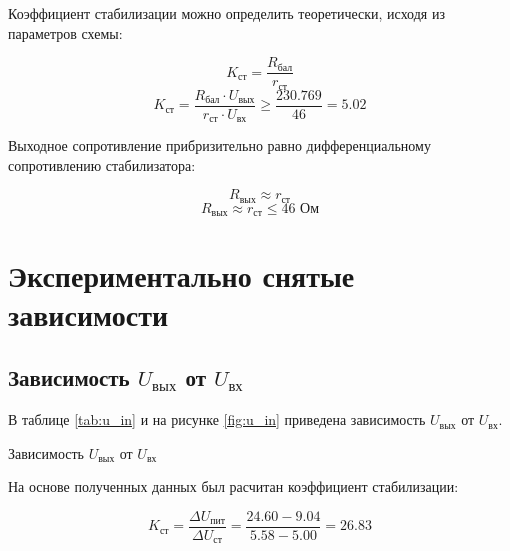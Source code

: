 Коэффициент стабилизации можно определить теоретически, исходя из параметров схемы:

\begin{equation}\label{eq:k_st}
K_\text{ст} = \frac{R_\text{бал}}{r_\text{ст}}
\end{equation}
\[
K_\text{ст} = \frac{R_\text{бал} \cdot U_\text{вых}}{r_\text{ст} \cdot U_\text{вх}} \geq \frac{230.769}{46} = 5.02
\]

\vspace{0.5cm}

Выходное сопротивление прибризительно равно дифференциальному сопротивлению стабилизатора:

\begin{equation}\label{eq:r_out}
R_\text{вых} \approx r_{\text{ст}}
\end{equation}
\[
R_\text{вых} \approx r_{\text{ст}} \leq 46 \text{ Ом}
\]

\section{Экспериментально снятые зависимости}

\subsection{Зависимость $U_\text{вых}$ от $U_\text{вх}$}

В таблице \ref{tab:u_in} и на рисунке \ref{fig:u_in} приведена зависимость $U_\text{вых}$ от $U_\text{вх}$.

\begin{table}[H]
\begin{center}
	\caption{Зависимость $U_\text{вых}$ от $U_\text{вх}$}
	\label{tab:u_in}
	\def\tabcolsep{40pt}
\end{center}
\end{table}

На основе полученных данных был расчитан коэффициент стабилизации:

\[
K_\text{ст} = \frac{\Delta U_\text{пит}}{\Delta U_\text{ст}} = \frac{24.60 - 9.04}{5.58 - 5.00} = 26.83
\]

